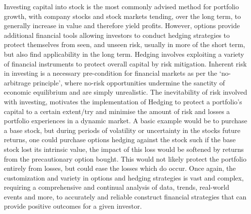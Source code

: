 \documentclass[
	a4paper, %
	11pt, %
	twoside, %
]{LTJournalArticle}
\begin{document}
Investing capital into stock is the most commonly advised method for portfolio growth, with company stocks and stock markets tending, over the long term, to generally increase in value and therefore yield profits.
However, options provide additional financial tools allowing investors to conduct hedging strategies to protect themselves from seen, and unseen risk, usually in more of the short term, but also find applicability in the long term.
Hedging involves exploiting a variety of financial instruments to protect overall capital by risk mitigation.
Inherent risk in investing is a necessary pre-condition for financial markets as per the `no-arbitrage principle', where no-risk opportunities undermine the sanctity of economic equilibrium and are simply unrealistic.
The inevitability of risk involved with investing, motivates the implementation of Hedging to protect a portfolio's capital to a certain extent/try and minimise the amount of risk and losses a portfolio experiences in a dynamic market.
A basic example would be to purchase a base stock, but during periods of volatility or uncertainty in the stocks future returns, one could purchase options hedging against the stock such if the base stock lost its intrinsic value, the impact of this loss would be softened by returns from the precautionary option bought.
This would not likely protect the portfolio entirely from losses, but could ease the losses which do occur.
Once again, the customization and variety in options and hedging strategies is vast and complex, requiring a comprehensive and continual analysis of data, trends, real-world events and more, to accurately and reliable construct financial strategies that can provide positive outcomes for a given investor.
\end{document}
